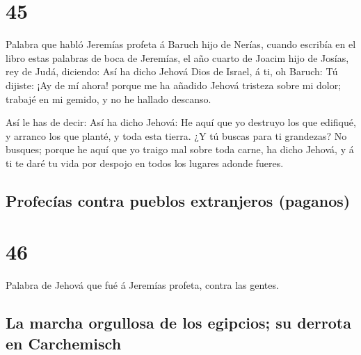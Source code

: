 \hypertarget{section-44}{%
\section{45}\label{section-44}}

 Palabra que habló Jeremías profeta á Baruch hijo de Nerías,
cuando escribía en el libro estas palabras de boca de Jeremías, el año
cuarto de Joacim hijo de Josías, rey de Judá, diciendo:  Así
ha dicho Jehová Dios de Israel, á ti, oh Baruch:  Tú
dijiste: ¡Ay de mí ahora! porque me ha añadido Jehová tristeza sobre mi
dolor; trabajé en mi gemido, y no he hallado descanso.

 Así le has de decir: Así ha dicho Jehová: He aquí que yo
destruyo los que edifiqué, y arranco los que planté, y toda esta tierra.
 ¿Y tú buscas para ti grandezas? No busques; porque he aquí
que yo traigo mal sobre toda carne, ha dicho Jehová, y á ti te daré tu
vida por despojo en todos los lugares adonde fueres.

\hypertarget{profecuxedas-contra-pueblos-extranjeros-paganos}{%
\subsection{Profecías contra pueblos extranjeros
(paganos)}\label{profecuxedas-contra-pueblos-extranjeros-paganos}}

\hypertarget{section-45}{%
\section{46}\label{section-45}}

 Palabra de Jehová que fué á Jeremías profeta, contra las
gentes.

\hypertarget{la-marcha-orgullosa-de-los-egipcios-su-derrota-en-carchemisch}{%
\subsection{La marcha orgullosa de los egipcios; su derrota en
Carchemisch}\label{la-marcha-orgullosa-de-los-egipcios-su-derrota-en-carchemisch}}

